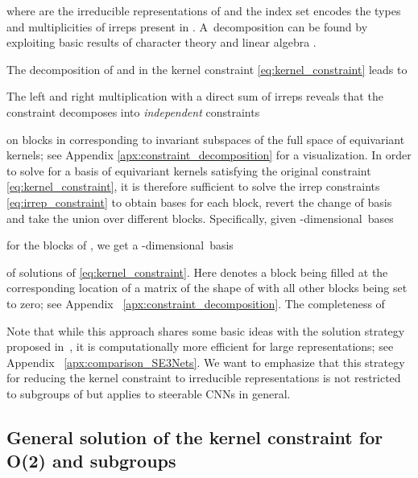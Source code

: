 \documentclass{article}
\newcommand{\apx}{Appendix\xspace
}
\newlength{\secBefore}
\newlength{\secAfter}
\newlength{\subsecBefore}
\newlength{\subsecAfter}
\begin{document}
where  are the irreducible representations of  and the index set  encodes the types and multiplicities of irreps present in .
A~decomposition can be found by exploiting basic results of character theory and linear algebra \cite{serre1977linear}.

The decomposition of  and  in the kernel constraint \eqref{eq:kernel_constraint} leads to

The left and right multiplication with a direct sum of irreps reveals that the constraint decomposes into \emph{independent} constraints

on blocks  in  corresponding to invariant subspaces of the full space of equivariant kernels; see \apx \ref{apx:constraint_decomposition} for a visualization.
In order to solve for a basis of equivariant kernels satisfying the original constraint \eqref{eq:kernel_constraint}, it is therefore sufficient to solve the irrep constraints \eqref{eq:irrep_constraint} to obtain bases for each block, revert the change of basis and take the union over different blocks.
Specifically, given \mbox{-dimensional bases}

for the blocks  of , we get a -dimensional~basis

of solutions of \eqref{eq:kernel_constraint}.
Here  denotes a block  being filled at the corresponding location of a matrix of the shape of  with all other blocks being set to zero; see \apx~\ref{apx:constraint_decomposition}.
The completeness of


Note that while this approach shares some basic ideas with the solution strategy proposed in~\cite{3d_steerableCNNs}, it is computationally more efficient for large representations; see \apx~\ref{apx:comparison_SE3Nets}.
We want to emphasize that this strategy for reducing the kernel constraint to irreducible representations is not restricted to subgroups of  but applies to steerable CNNs in general.

 	

\vspace*{\subsecBefore}
\subsection{General solution of the kernel constraint for O(2) and subgroups}
\label{sec:kernel_constraint_solution_main}
\vspace*{\subsecAfter}
\end{document}
